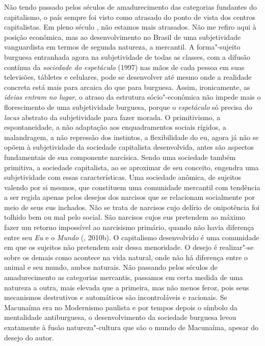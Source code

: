 {Não tendo passado pelos séculos de amadurecimento das categorias
fundantes do capitalismo, o país sempre foi visto como atrasado do ponto
de vista dos centros capitalistas. Em pleno século , não estamos mais
atrasados. Não me refiro aqui à posição econômica, mas ao
desenvolvimento no Brasil de uma subjetividade vanguardista em termos de
segunda natureza, a mercantil. A forma"-sujeito burguesa entranhada agora
na subjetividade de todas as classes, com a difusão contínua da
\emph{sociedade do espetáculo} (1997) nas mãos de cada pessoa em
suas televisões, tábletes e celulares, pode se desenvolver até mesmo
onde a realidade concreta está mais para arcaica do que para burguesa.
Assim, ironicamente, as \emph{ideias entram no lugar}, o atraso da
estrutura sócio"-econômica não impede mais o florescimento de uma
subjetividade burguesa, porque o \emph{espetáculo} só precisa do
\emph{locus} abstrato da subjetividade para fazer morada. O
primitivismo, a espontaneidade, a não adaptação aos enquadramentos
sociais rígidos, a malandragem, a não repressão dos instintos, a
flexibilidade do eu, agora já não se opõem à subjetividade da sociedade
capitalista desenvolvida, antes são aspectos fundamentais de sua
componente narcísica. Sendo uma sociedade também primitiva, a sociedade
capitalista, ao se aproximar de seu conceito, engendra uma subjetividade
com essas características. Uma sociedade anômica, de sujeitos valendo
por si mesmos, que constituem uma comunidade mercantil com tendência a
ser regida apenas pelos desejos dos narcisos que se relacionam
socialmente por meio de seus eus inchados. Não se trata de narcisos cujo
delírio de onipotência foi tolhido bem ou mal pelo social. São narcisos
cujos eus pretendem ao máximo fazer um retorno impossível ao narcisismo
primário, quando não havia diferença entre seu \emph{Eu} e o
\emph{Mundo} (, 2010b). O capitalismo desenvolvido é uma
comunidade em que os sujeitos não pretendem sair dessa menoridade. O
desejo é realizar"-se sobre os demais como acontece na vida natural, onde
não há diferença entre o animal e seu mundo, ambos naturais. Não
passando pelos séculos de amadurecimento as categorias mercantis,
passamos em certa medida de uma natureza a outra, mais elevada que a
primeira, mas não menos feroz, pois seus mecanismos destrutivos e
automáticos são incontroláveis e racionais. Se Macunaíma era no
Modernismo paulista e por tempos depois o símbolo da mentalidade
antiburguesa, o desenvolvimento da sociedade burguesa levou exatamente à
fusão natureza"-cultura que são o mundo de Macunaíma, apesar do desejo do
autor.

}

